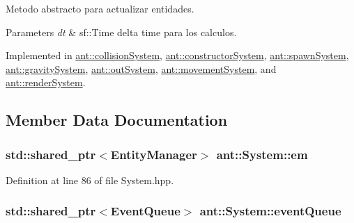 Metodo abstracto para actualizar entidades. 


\begin{DoxyParams}{Parameters}
{\em dt} & sf\+::\+Time delta time para los calculos. \\
\hline
\end{DoxyParams}


Implemented in \hyperlink{classant_1_1collision_system_abef6a9cb5378ddb9ddf6cfdd46b6dbfa}{ant\+::collision\+System}, \hyperlink{classant_1_1constructor_system_a0c7631953ad4059cd52de6df967f37a0}{ant\+::constructor\+System}, \hyperlink{classant_1_1spawn_system_a080ec242e6f934bea895dbc3429bea9b}{ant\+::spawn\+System}, \hyperlink{classant_1_1gravity_system_a60c3a55f5249bb6058b7673c64164457}{ant\+::gravity\+System}, \hyperlink{classant_1_1out_system_a7d0732d434eaf926b5c0674e24e9680c}{ant\+::out\+System}, \hyperlink{classant_1_1movement_system_af7017a1d594b18a8a8d3bf925cd00881}{ant\+::movement\+System}, and \hyperlink{classant_1_1render_system_a9a8fd550b795db266510831276bfe957}{ant\+::render\+System}.



\subsection{Member Data Documentation}
\hypertarget{classant_1_1_system_a5661d872ff769be150bd4e9a9552f6b9}{
\subsubsection[{em}]{\setlength{\rightskip}{0pt plus 5cm}std\+::shared\+\_\+ptr$<${\bf Entity\+Manager}$>$ ant\+::\+System\+::em\hspace{0.3cm}{\ttfamily [protected]}}}\label{classant_1_1_system_a5661d872ff769be150bd4e9a9552f6b9}


Definition at line 86 of file System.\+hpp.

\hypertarget{classant_1_1_system_a27e1814e13d161b5ef0e848e3da16d29}{
\subsubsection[{event\+Queue}]{\setlength{\rightskip}{0pt plus 5cm}std\+::shared\+\_\+ptr$<${\bf Event\+Queue}$>$ ant\+::\+System\+::event\+Queue\hspace{0.3cm}{\ttfamily [protected]}}}\label{classant_1_1_system_a27e1814e13d161b5ef0e848e3da16d29}


